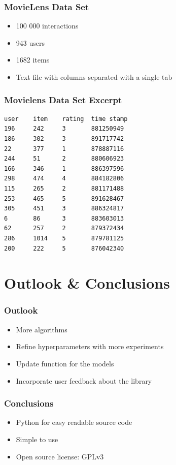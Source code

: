 \documentclass[mathserif,svgnames]{beamer}
\begin{document}
\begin{frame}
    \frametitle{MovieLens Data Set}
    \begin{itemize}
        \item 100 000 interactions
        \item 943 users
        \item 1682 items
        \item Text file with columns separated with a single tab
    \end{itemize}
\end{frame}
\begin{frame}[fragile]
    \frametitle{Movielens Data Set Excerpt}
\begin{lstlisting}
user    item    rating  time stamp
196     242     3       881250949
186     302     3       891717742
22      377     1       878887116
244     51      2       880606923
166     346     1       886397596
298     474     4       884182806
115     265     2       881171488
253     465     5       891628467
305     451     3       886324817
6       86      3       883603013
62      257     2       879372434
286     1014    5       879781125
200     222     5       876042340
\end{lstlisting}
\end{frame}

\section{Outlook \& Conclusions}
\begin{frame}
\frametitle{Outlook}\pause
\begin{itemize}
	\item More algorithms\pause
	\item Refine hyperparameters with more experiments\pause
	\item Update function for the models\pause
	\item Incorporate user feedback about the library
\end{itemize}
\end{frame}

\begin{frame} 
\frametitle{Conclusions} 
\begin{itemize}
    \item Python for easy readable source code \visible<2->{$\checkmark$}
    \item Simple to use 
    \item Open source license: GPLv3 
\end{itemize}
\end{frame}
\end{document}
